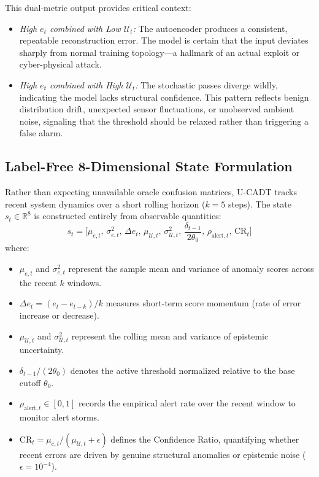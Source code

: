 \documentclass[conference]{IEEEtran}
\begin{document}
This dual-metric output provides critical context:
\begin{itemize}
    \item \textit{High $e_t$ combined with Low $\mathcal{U}_t$:} The autoencoder produces a consistent, repeatable reconstruction error. The model is certain that the input deviates sharply from normal training topology---a hallmark of an actual exploit or cyber-physical attack.
    \item \textit{High $e_t$ combined with High $\mathcal{U}_t$:} The stochastic passes diverge wildly, indicating the model lacks structural confidence. This pattern reflects benign distribution drift, unexpected sensor fluctuations, or unobserved ambient noise, signaling that the threshold should be relaxed rather than triggering a false alarm.
\end{itemize}

\subsection{Label-Free 8-Dimensional State Formulation}
Rather than expecting unavailable oracle confusion matrices, U-CADT tracks recent system dynamics over a short rolling horizon ($k=5$ steps). The state $s_t \in \mathbb{R}^8$ is constructed entirely from observable quantities:
\begin{equation}
s_t = \Big[ \mu_{e,t}, \, \sigma_{e,t}^2, \, \Delta e_t, \, \mu_{\mathcal{U},t}, \, \sigma_{\mathcal{U},t}^2, \, \frac{\delta_{t-1}}{2\theta_0}, \, \rho_{\text{alert},t}, \, \text{CR}_t \Big]
\end{equation}
where:
\begin{itemize}
    \item $\mu_{e,t}$ and $\sigma_{e,t}^2$ represent the sample mean and variance of anomaly scores across the recent $k$ windows.
    \item $\Delta e_t = (e_t - e_{t-k}) / k$ measures short-term score momentum (rate of error increase or decrease).
    \item $\mu_{\mathcal{U},t}$ and $\sigma_{\mathcal{U},t}^2$ represent the rolling mean and variance of epistemic uncertainty.
    \item $\delta_{t-1} / (2\theta_0)$ denotes the active threshold normalized relative to the base cutoff $\theta_0$.
    \item $\rho_{\text{alert},t} \in [0, 1]$ records the empirical alert rate over the recent window to monitor alert storms.
    \item $\text{CR}_t = \mu_{e,t} / (\mu_{\mathcal{U},t} + \epsilon)$ defines the Confidence Ratio, quantifying whether recent errors are driven by genuine structural anomalies or epistemic noise ($\epsilon = 10^{-4}$).
\end{itemize}
\end{document}
